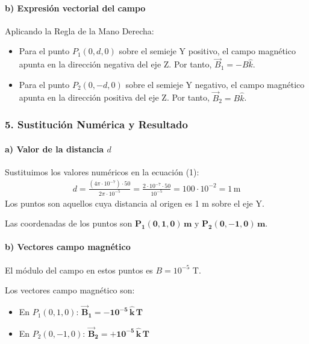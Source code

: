 \paragraph*{b) Expresión vectorial del campo}
Aplicando la Regla de la Mano Derecha:
\begin{itemize}
    \item Para el punto $P_1(0, d, 0)$ sobre el semieje Y positivo, el campo magnético apunta en la dirección negativa del eje Z. Por tanto, $\vec{B}_1 = -B \hat{k}$.
    \item Para el punto $P_2(0, -d, 0)$ sobre el semieje Y negativo, el campo magnético apunta en la dirección positiva del eje Z. Por tanto, $\vec{B}_2 = B \hat{k}$.
\end{itemize}

\subsubsection*{5. Sustitución Numérica y Resultado}
\paragraph*{a) Valor de la distancia $d$}
Sustituimos los valores numéricos en la ecuación (1):
\begin{gather}
    d = \frac{(4\pi \cdot 10^{-7}) \cdot 50}{2\pi \cdot 10^{-5}} = \frac{2 \cdot 10^{-7} \cdot 50}{10^{-5}} = 100 \cdot 10^{-2} = 1 \, \text{m}
\end{gather}
Los puntos son aquellos cuya distancia al origen es 1 m sobre el eje Y.
\begin{cajaresultado}
    Las coordenadas de los puntos son $\boldsymbol{P_1(0, 1, 0) \, \textbf{m}}$ y $\boldsymbol{P_2(0, -1, 0) \, \textbf{m}}$.
\end{cajaresultado}

\paragraph*{b) Vectores campo magnético}
El módulo del campo en estos puntos es $B = 10^{-5}$ T.
\begin{cajaresultado}
    Los vectores campo magnético son:
    \begin{itemize}
        \item En $P_1(0, 1, 0)$: $\boldsymbol{\vec{B}_1 = -10^{-5} \, \hat{k} \, \textbf{T}}$
        \item En $P_2(0, -1, 0)$: $\boldsymbol{\vec{B}_2 = +10^{-5} \, \hat{k} \, \textbf{T}}$
    \end{itemize}
\end{cajaresultado}

